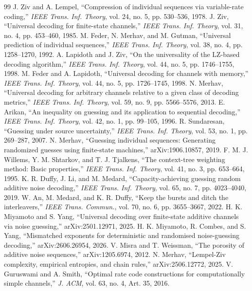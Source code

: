 \documentclass[11pt]{article}
\begin{document}
\begin{thebibliography}{99}
 J. Ziv and A. Lempel, ``Compression of individual sequences via variable-rate coding,'' \emph{IEEE Trans. Inf. Theory}, vol. 24, no. 5, pp. 530--536, 1978.
 J. Ziv, ``Universal decoding for finite-state channels,'' \emph{IEEE Trans. Inf. Theory}, vol. 31, no. 4, pp. 453--460, 1985.
 M. Feder, N. Merhav, and M. Gutman, ``Universal prediction of individual sequences,'' \emph{IEEE Trans. Inf. Theory}, vol. 38, no. 4, pp. 1258--1270, 1992.
 A. Lapidoth and J. Ziv, ``On the universality of the LZ-based decoding algorithm,'' \emph{IEEE Trans. Inf. Theory}, vol. 44, no. 5, pp. 1746--1755, 1998.
 M. Feder and A. Lapidoth, ``Universal decoding for channels with memory,'' \emph{IEEE Trans. Inf. Theory}, vol. 44, no. 5, pp. 1726--1745, 1998.
 N. Merhav, ``Universal decoding for arbitrary channels relative to a given class of decoding metrics,'' \emph{IEEE Trans. Inf. Theory}, vol. 59, no. 9, pp. 5566--5576, 2013.
 E. Arikan, ``An inequality on guessing and its application to sequential decoding,'' \emph{IEEE Trans. Inf. Theory}, vol. 42, no. 1, pp. 99--105, 1996.
 R. Sundaresan, ``Guessing under source uncertainty,'' \emph{IEEE Trans. Inf. Theory}, vol. 53, no. 1, pp. 269--287, 2007.
 N. Merhav, ``Guessing individual sequences: Generating randomized guesses using finite-state machines,'' arXiv:1906.10857, 2019.
 F. M. J. Willems, Y. M. Shtarkov, and T. J. Tjalkens, ``The context-tree weighting method: Basic properties,'' \emph{IEEE Trans. Inf. Theory}, vol. 41, no. 3, pp. 653--664, 1995.
 K. R. Duffy, J. Li, and M. Medard, ``Capacity-achieving guessing random additive noise decoding,'' \emph{IEEE Trans. Inf. Theory}, vol. 65, no. 7, pp. 4023--4040, 2019.
 W. An, M. Medard, and K. R. Duffy, ``Keep the bursts and ditch the interleavers,'' \emph{IEEE Trans. Commun.}, vol. 70, no. 6, pp. 3655--3667, 2022.
 H. K. Miyamoto and S. Yang, ``Universal decoding over finite-state additive channels via noise guessing,'' arXiv:2501.12971, 2025.
 H. K. Miyamoto, R. Combes, and S. Yang, ``Mismatched exponents for deterministic and randomised noise-guessing decoding,'' arXiv:2606.26954, 2026.
 V. Misra and T. Weissman, ``The porosity of additive noise sequences,'' arXiv:1205.6974, 2012.
 N. Merhav, ``Lempel-Ziv complexity, empirical entropies, and chain rules,'' arXiv:2506.12772, 2025.
 V. Guruswami and A. Smith, ``Optimal rate code constructions for computationally simple channels,'' \emph{J. ACM}, vol. 63, no. 4, Art. 35, 2016.
\end{thebibliography}
\end{document}
